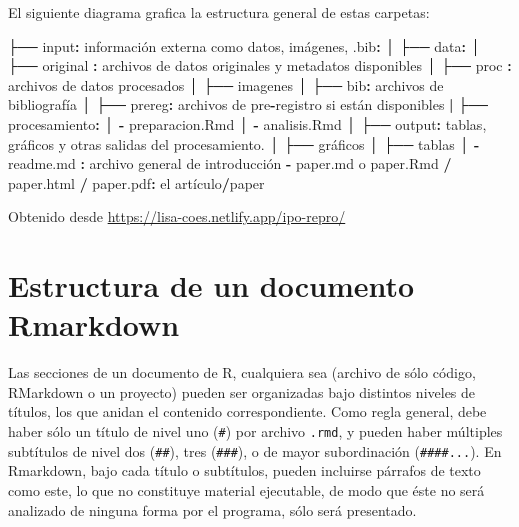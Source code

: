 \documentclass[
]{book}
\newenvironment{Shaded}{\begin{snugshade}}{\end{snugshade}}
\newcommand{\NormalTok}[1]{#1}
\newcommand{\SpecialCharTok}[1]{\textcolor[rgb]{0.81,0.36,0.00}{\textbf{#1}}}
\begin{document}
El siguiente diagrama grafica la estructura general de estas carpetas:

\begin{Shaded}
\begin{Highlighting}[]
\NormalTok{├── input}\SpecialCharTok{:}\NormalTok{ información externa como datos, imágenes, .bib}\SpecialCharTok{:}  
\NormalTok{│   ├── data}\SpecialCharTok{:}
\NormalTok{│     ├── original }\SpecialCharTok{:}\NormalTok{ archivos de datos originales y metadatos disponibles}
\NormalTok{│     ├── proc     }\SpecialCharTok{:}\NormalTok{ archivos de datos procesados}
\NormalTok{│   ├── imagenes}
\NormalTok{│   ├── bib}\SpecialCharTok{:}\NormalTok{ archivos de bibliografía}
\NormalTok{│   ├── prereg}\SpecialCharTok{:}\NormalTok{ archivos de pre}\SpecialCharTok{{-}}\NormalTok{registro si están disponibles}
\SpecialCharTok{|}
\NormalTok{├── procesamiento}\SpecialCharTok{:}
\NormalTok{│   }\SpecialCharTok{{-}}\NormalTok{ preparacion.Rmd}
\NormalTok{│   }\SpecialCharTok{{-}}\NormalTok{ analisis.Rmd}
\NormalTok{│}
\NormalTok{├── output}\SpecialCharTok{:}\NormalTok{ tablas, gráficos y otras salidas del procesamiento.}
\NormalTok{│   ├── gráficos}
\NormalTok{│   ├── tablas}
\NormalTok{│}
\SpecialCharTok{{-}}\NormalTok{ readme.md }\SpecialCharTok{:}\NormalTok{ archivo general de introducción}
\SpecialCharTok{{-}}\NormalTok{ paper.md o paper.Rmd }\SpecialCharTok{/}\NormalTok{ paper.html }\SpecialCharTok{/}\NormalTok{ paper.pdf}\SpecialCharTok{:}\NormalTok{ el artículo}\SpecialCharTok{/}\NormalTok{paper}
\end{Highlighting}
\end{Shaded}

Obtenido desde \url{https://lisa-coes.netlify.app/ipo-repro/}

\hypertarget{estructura-de-un-documento-rmarkdown}{%
\section{Estructura de un documento Rmarkdown}\label{estructura-de-un-documento-rmarkdown}}

Las secciones de un documento de R, cualquiera sea (archivo de sólo código, RMarkdown o un proyecto) pueden ser organizadas bajo distintos niveles de títulos, los que anidan el contenido correspondiente. Como regla general, debe haber sólo un título de nivel uno (\texttt{\#}) por archivo \texttt{.rmd}, y pueden haber múltiples subtítulos de nivel dos (\texttt{\#\#}), tres (\texttt{\#\#\#}), o de mayor subordinación (\texttt{\#\#\#\#...}).
En Rmarkdown, bajo cada título o subtítulos, pueden incluirse párrafos de texto como este, lo que no constituye material ejecutable, de modo que éste no será analizado de ninguna forma por el programa, sólo será presentado.
\end{document}

